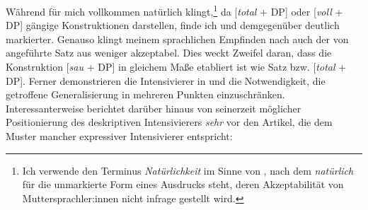 \ea   \label{Haha}
 \z
 \z
Während  für mich vollkommen natürlich klingt,\footnote{Ich verwende den Terminus \textit{Natürlichkeit} im Sinne von \citet[113]{Dressler.1989}, nach dem \textit{natürlich} für die unmarkierte Form eines Ausdrucks steht, deren Akzeptabilität von Muttersprachler:innen nicht infrage gestellt wird.} da [\textit{total} + DP] oder [\textit{voll} + DP] gängige Konstruktionen darstellen, finde ich { und } demgegenüber deutlich markierter. Genauso klingt meinem sprachlichen Empfinden nach auch der von \citet[20]{Gutzmann.2019a} angeführte Satz {aus } weniger akzeptabel. Dies weckt Zweifel daran, dass die Konstruktion {[\textit{sau} + DP]} in gleichem Maße etabliert ist wie Satz  bzw. [\textit{total} + DP]. Ferner demonstrieren die Intensivierer in  und  die Notwendigkeit, die getroffene Generalisierung in mehreren Punkten einzuschränken. Interessanterweise berichtet \citet[266]{Becher.1907} darüber hinaus von seinerzeit möglicher Positionierung des deskriptiven Intensivierers \textit{sehr} vor den Artikel, die dem Muster mancher expressiver Intensivierer entspricht:
